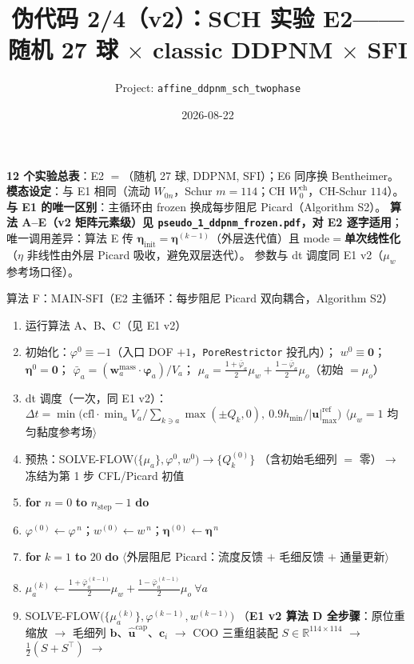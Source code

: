 \documentclass[11pt]{article}
\title{\bfseries 伪代码 2/4（v2）：SCH 实验 E2——随机 27 球 $\times$ classic DDPNM $\times$ SFI}
\author{Project: \texttt{affine\_ddpnm\_sch\_twophase}}
\date{2026-08-22}
\newcommand{\code}[1]{\texttt{#1}}
\newcommand{\iu}{\hat{\bm u}}
\newcommand{\kwd}[1]{\textbf{#1}}
\newcommand{\cmt}[1]{{\color{cmtclr}$\langle$#1$\rangle$}}
\newcommand{\ind}{\hspace*{1.5em}}
\newcommand{\indd}{\hspace*{3.0em}}
\newenvironment{pseudo}[1]{\begin{algobox}{#1}%
  \begin{enumerate}[label={\ttfamily\arabic*}, leftmargin=3.4em, itemsep=1.5pt, topsep=1pt, parsep=0pt]}%
  {\end{enumerate}\end{algobox}}
\begin{document}
\maketitle

\noindent\textbf{12 个实验总表}：E2 $=$（随机 27 球, DDPNM, SFI）；E6 同序换 Bentheimer。
\textbf{模态设定}：与 E1 相同（流动 $W_{0n}$，Schur $m=114$；CH $W^{\mathrm{ch}}_0$，CH-Schur $114$）。
\textbf{与 E1 的唯一区别}：主循环由 frozen 换成每步阻尼 Picard（Algorithm S2）。
\textbf{算法 A--E（v2 矩阵元素级）见 \texttt{pseudo\_1\_ddpnm\_frozen.pdf}，对 E2 逐字适用}；
唯一调用差异：算法 E 传 $\bm\eta_{\mathrm{init}}=\bm\eta^{(k-1)}$（外层迭代值）且
$\mathrm{mode}=$\textbf{单次线性化}（$\eta$ 非线性由外层 Picard 吸收，避免双层迭代）。
参数与 dt 调度同 E1 v2（$\mu_w$ 参考场口径）。

\begin{pseudo}{算法 F：MAIN-SFI（E2 主循环：每步阻尼 Picard 双向耦合，Algorithm S2）}
\item 运行算法 A、B、C（见 E1 v2）
\item 初始化：$\varphi^0\equiv-1$（入口 DOF $+1$，\code{PoreRestrictor} 投孔内）；
$w^0\equiv\bm 0$；$\bm\eta^0=\bm 0$；
$\bar\varphi_a=(\bm w^{\mathrm{mass}}_a\!\cdot\!\bm\varphi_a)/V_a$；
$\mu_a=\tfrac{1+\bar\varphi_a}{2}\mu_w+\tfrac{1-\bar\varphi_a}{2}\mu_o$（初始 $=\mu_o$）
\item dt 调度（一次，同 E1 v2）：
$\Delta t=\min\big(\mathrm{cfl}\cdot\min_aV_a/\sum_{k\ni a}\max(\pm Q_k,0),\ 0.9h_{\min}/|\bm u|_{\max}^{\mathrm{ref}}\big)$
\cmt{$\mu_w=1$ 均匀黏度参考场}
\item 预热：SOLVE-FLOW$\big(\{\mu_a\},\varphi^0,w^0\big)\to\{Q_k^{(0)}\}$
（含初始毛细列 $=$ 零）$\to$ 冻结为第 1 步 CFL/Picard 初值
\item \kwd{for} $n=0$ \kwd{to} $n_{\mathrm{step}}-1$ \kwd{do}
\item \ind $\varphi^{(0)}\leftarrow\varphi^{\,n}$；$w^{(0)}\leftarrow w^{\,n}$；$\bm\eta^{(0)}\leftarrow\bm\eta^{\,n}$
\item \ind \kwd{for} $k=1$ \kwd{to} $20$ \kwd{do} \cmt{外层阻尼 Picard：流度反馈 $+$ 毛细反馈 $+$ 通量更新}
\item \indd $\mu_a^{(k)}\leftarrow\tfrac{1+\bar\varphi_a^{(k-1)}}{2}\mu_w
+\tfrac{1-\bar\varphi_a^{(k-1)}}{2}\mu_o\ \forall a$
\item \indd SOLVE-FLOW$\big(\{\mu_a^{(k)}\},\varphi^{(k-1)},w^{(k-1)}\big)$
（\textbf{E1 v2 算法 D 全步骤}：原位重缩放 $\to$ 毛细列 $\bm b$、$\iu^{\mathrm{cap}}$、$\bm c_i$
$\to$ COO 三重组装配 $S\in\mathbb R^{114\times114}$ $\to$ $\tfrac12(S{+}S^{\!\top})$ $\to$

\end{pseudo}
\end{document}
